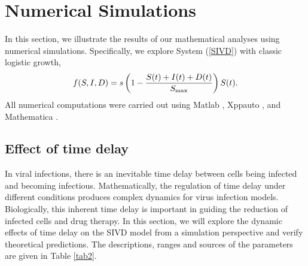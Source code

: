 \documentclass{CMHPhD-SIVD}
\begin{document}
\section{Numerical Simulations}\label{sec4}
In this section, we illustrate the results of our mathematical analyses using numerical simulations.
Specifically,  we explore System (\ref{SIVD}) with classic logistic growth,
$$f(S, I, D) = s\left(1-\frac{S(t)+I(t)+D(t)}{S_{\text{max}}}\right)S(t).$$
All numerical computations were carried out using Matlab \cite{shampine2001solving}, Xppauto \cite{ermentrout2002animating,ermentrout2003simulating}, and Mathematica \cite{wellin2005introduction,hazrat2010mathematica}.


\subsection{Effect of time delay}
In viral infections, there is an inevitable time delay between cells being infected and becoming infectious. Mathematically, the regulation of time delay under different conditions produces complex dynamics for virus infection models. Biologically, this inherent time delay is important in guiding the reduction of infected cells and drug therapy. In this section, we will explore the dynamic effects of time delay on the SIVD model from a simulation perspective and verify theoretical predictions. The descriptions, ranges and sources of the parameters are given in Table \ref{tab2}.

\begin{table}[htbp!]
\caption{List of parameters.}
\centering
{}
\label{tab2}
\end{table}
\end{document}
